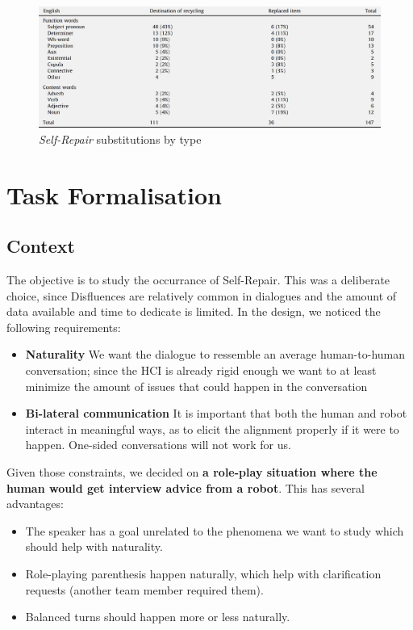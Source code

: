 \documentclass[11pt]{article}
\begin{document}
\begin{figure}[h]
	
	\centering
	\includegraphics[width=\textwidth]{fox_replacement}
	\caption{\emph{Self-Repair} substitutions by type \cite{fox20102487}}
	\label{fox_replacement}
\end{figure}






\section{Task Formalisation}

\subsection{Context}

The objective is to study the occurrance of Self-Repair. This was a deliberate choice, since Disfluences are relatively common in dialogues and the amount of data available and time to dedicate is limited. In the design, we noticed the following requirements:
\begin{itemize}
	\item \textbf{Naturality} We want the dialogue to ressemble an average human-to-human conversation; since the HCI is already rigid enough we want to at least minimize the amount of issues that could happen in the conversation
	\item \textbf{Bi-lateral communication} It is important that both the human and robot interact in meaningful ways, as to elicit the alignment properly if it were to happen. One-sided conversations will not work for us.
\end{itemize}

Given those constraints, we decided on \textbf{a role-play situation where the human would get interview advice from a robot}. This has several advantages:
\begin{itemize}
	\item The speaker has a goal unrelated to the phenomena we want to study which should help with naturality.
	\item Role-playing parenthesis happen naturally, which help with clarification requests (another team member required them).
	\item Balanced turns should happen more or less naturally.
\end{itemize}
\end{document}
